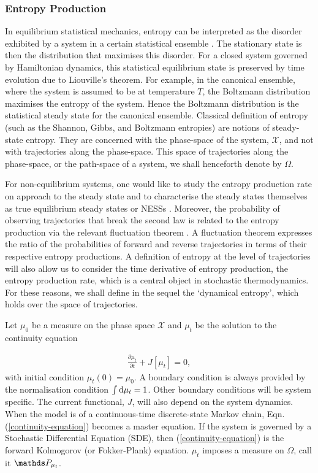 \subsubsection{Entropy Production}\label{subsection:entropy-prod-discussion}
In equilibrium statistical mechanics, entropy can be interpreted as the disorder exhibited by a system in a certain statistical ensemble \cite{wehrl1978general}. The stationary state is then the distribution that maximises this disorder. For a closed system governed by Hamiltonian dynamics, this statistical equilibrium state is preserved by time evolution due to Liouville's theorem. For example, in the canonical ensemble, where the system is assumed to be at temperature $T$, the Boltzmann distribution maximises the entropy of the system. Hence the Boltzmann distribution is the statistical steady state for the canonical ensemble. Classical definition of entropy (such as the Shannon, Gibbs, and Boltzmann entropies) are notions of steady-state entropy. They are concerned with the phase-space of the system, $\mathcal{X}$, and not with trajectories along the phase-space. This space of trajectories along the phase-space, or the path-space of a system, we shall henceforth denote by $\Omega$. 

For non-equilibrium systems, one would like to study the entropy production rate on approach to the steady state and to characterise the steady states themselves as true equilibrium steady states or NESSs  \cite{NESS_identify}. Moreover, the probability of observing trajectories that break the second law is related to the entropy production via the relevant fluctuation theorem  \cite[see \S 7]{gallavotti1995dynamical, exten-fluctuation_thm}. A fluctuation theorem expresses the ratio of the probabilities of forward and reverse trajectories in terms of their respective entropy productions. A definition of entropy at the level of trajectories will also allow us to consider the time derivative of entropy production, the entropy production rate, which is a central object in stochastic thermodynamics. For these reasons, we shall define in the sequel the `dynamical entropy', which holds over the space of trajectories.    

Let $\mu_0$ be a measure on the phase space $\mathcal{X}$ and $\mu_t$ be the solution to the continuity equation

\begin{align}\label{continuity-equation}
\frac{\partial \mu_t}{\partial t} + J[\mu_t] = 0,
\end{align}
with initial condition $\mu_t(0) = \mu_0$. A boundary condition is always provided by the normalisation condition $\int \mathrm{d} \mu_t = 1$. Other boundary conditions will be system specific. The current functional, $J$, will also depend on the system dynamics. When the model is of a continuous-time discrete-state Markov chain, Eqn. (\ref{continuity-equation}) becomes a master equation. If the system is governed by a Stochastic Differential Equation (SDE), then (\ref{continuity-equation}) is the forward Kolmogorov (or Fokker-Plank) equation. $\mu_t$ imposes a measure on $\Omega$, call it $\bP_{\mu_t}$. 


